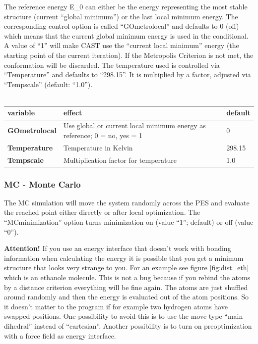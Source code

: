 \documentclass[10pt,a4paper]{article} %
\begin{document}
	The reference energy E\_0 can either be the energy representing the most stable structure (current ``global minimum'') or the last local minimum energy. The corresponding control option is called ``GOmetrolocal'' and defaults to 0 (off) which means that the current global minimum energy is used in the conditional. A value of ``1'' will make \ac{CAST} use the ``current local minimum'' energy (the starting point of the current iteration). If the Metropolis Criterion is not met, the conformation will be discarded.
	The temperature used is controlled via ``Temperature'' and defaults to ``298.15''. It is multiplied by a factor, adjusted via ``Tempscale'' (default: ``1.0'').\\~\\
	
	\begin{tabularx}{\textwidth}{l|X|X}
		variable & effect & default\\
		\hline
		\textbf{GOmetrolocal} & Use global or current local minimum energy as reference; 0 = no, yes = 1 & 0 \\
		\textbf{Temperature} & Temperature in Kelvin & 298.15 \\
		\textbf{Tempscale} & Multiplication factor for temperature & 1.0
	\end{tabularx}
	
	\subsubsection{MC - Monte Carlo}
	The \ac{MC} simulation will move the system randomly across the \ac{PES} and evaluate the reached point either directly or after local optimization. The ``MCminimization'' option turns minimization on (value ``1''; default) or off (value ``0''). 
	
	\textbf{Attention!}
	If you use an energy interface that doesn't work with bonding information when calculating the energy it is possible that you get a minimum structure that looks very strange to you. For an example see figure \ref{fig:dist_eth} which is an ethanole molecule. This is not a bug because if you rebind the atoms by a distance criterion everything will be fine again. The atoms are just shuffled around randomly and then the energy is evaluated out of the atom positions. So it doesn't matter to the program if for example two hydrogen atoms have swapped positions. One possibility to avoid this is to use the move type ``main dihedral'' instead of ``cartesian''. Another possibility is to turn on preoptimization with a force field as energy interface.
	
\end{document}
